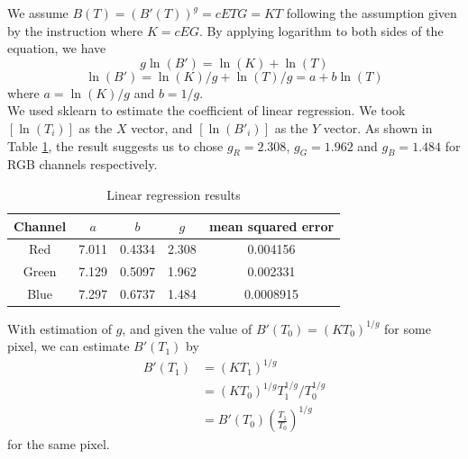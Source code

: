 \documentclass[10pt,twocolumn,letterpaper]{article}
\begin{document}
We assume $B(T) = (B'(T))^g = cETG = KT  $ following the assumption given by the instruction where $K = cEG$. By applying logarithm to both sides of the equation, we have 
$$ g\ln(B') = \ln(K) + \ln(T) $$
$$ \ln(B') = \ln(K)/g + \ln(T)/g = a + b\ln(T) $$ where $a = \ln(K)/g$ and $b=1/g$. \\

We used sklearn to estimate the coefficient of linear regression. We took $[\ln(T_i)]$ as the $X$ vector, and $[\ln(B'_i)]$ as the $Y$ vector. As shown in Table \ref{tab:linear}, the result suggests us to chose $g_R = 2.308$, $g_G = 1.962$ and $g_B = 1.484$ for RGB channels respectively.\\


\begin{table}[]
\caption{Linear regression results}
\centering
\begin{tabular}{|c|c|c|c|c|}
\hline
Channel &  $a$  &  $b$ & $g$ & mean squared error  \\
\hline

Red & 7.011 & 0.4334 & 2.308 & 0.004156 \\
\hline
Green & 7.129& 0.5097 & 1.962 & 0.002331\\
\hline
Blue & 7.297 & 0.6737 & 1.484 & 0.0008915\\
\hline

 \hline

\end{tabular}
\label{tab:linear}
\end{table}


With estimation of $g$, and given the value of $B'(T_0) = (KT_0)^{1/g}$ for some pixel, we can estimate $B'(T_1)$ by 
\begin{equation}
\begin{aligned}
B'(T_1)     &=  (KT_1)^{1/g}\\
            &=  (KT_0)^{1/g}T_1^{1/g}/T_0^{1/g}\\
            &=  B'(T_0) (\frac{T_1}{T_0})^{1/g}
\end{aligned}
\end{equation}
for the same pixel.
\end{document}
